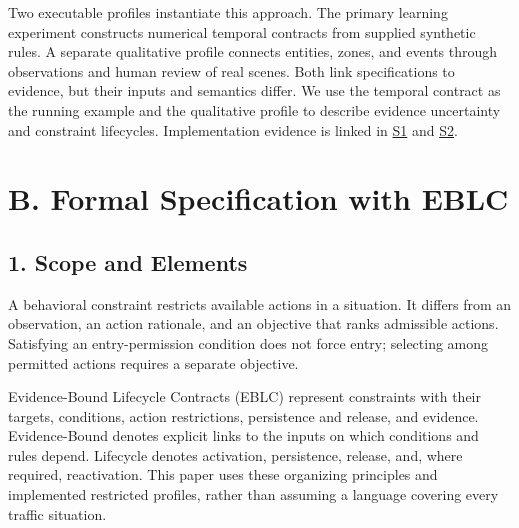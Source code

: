 \documentclass[11pt,a4paper]{article}
\begin{document}
Two executable profiles instantiate this approach. The primary learning experiment constructs numerical temporal contracts from supplied synthetic rules. A separate qualitative profile connects entities, zones, and events through observations and human review of real scenes. Both link specifications to evidence, but their inputs and semantics differ. We use the temporal contract as the running example and the qualitative profile to describe evidence uncertainty and constraint lifecycles. Implementation evidence is linked in \href{\detokenize{../../../../../../projects/04-guardsynth-coc/experiments/paper1_cnl_learning/temporal_preservation.py}}{S1} and \href{\detokenize{../../../../../../platforms/eblc-bcv/src/guard_synth_eblc/action_contract.py}}{S2}.\par

\section*{B. Formal Specification with EBLC}

\subsection*{1. Scope and Elements}

A behavioral constraint restricts available actions in a situation. It differs from an observation, an action rationale, and an objective that ranks admissible actions. Satisfying an entry-permission condition does not force entry; selecting among permitted actions requires a separate objective.\par

Evidence-Bound Lifecycle Contracts (EBLC) represent constraints with their targets, conditions, action restrictions, persistence and release, and evidence. Evidence-Bound denotes explicit links to the inputs on which conditions and rules depend. Lifecycle denotes activation, persistence, release, and, where required, reactivation. This paper uses these organizing principles and implemented restricted profiles, rather than assuming a language covering every traffic situation.\par
\end{document}
